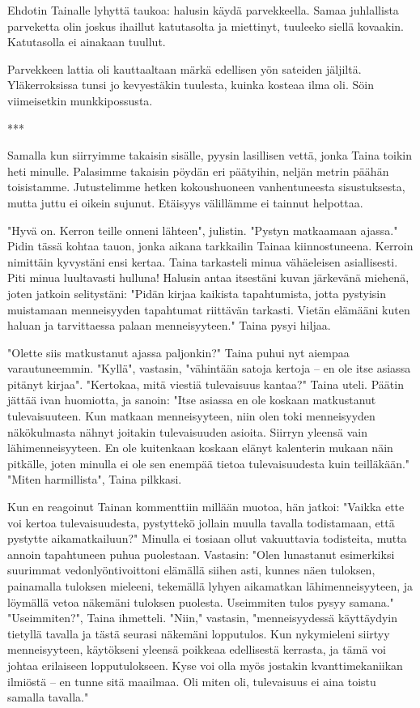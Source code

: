 ﻿\documentclass[a4paper, 12pt, finnish]{article}
\begin{document}
Ehdotin Tainalle lyhyttä taukoa: halusin käydä parvekkeella. Samaa
juhlallista parveketta olin joskus ihaillut katutasolta
ja miettinyt, tuuleeko siellä kovaakin. Katutasolla ei ainakaan tuullut.

Parvekkeen lattia oli kauttaaltaan märkä edellisen yön sateiden
jäljiltä. Yläkerroksissa tunsi jo kevyestäkin tuulesta, kuinka
kosteaa ilma oli. Söin viimeisetkin munkkipossusta.

***

Samalla kun siirryimme takaisin sisälle, pyysin lasillisen vettä,
jonka Taina toikin heti minulle. Palasimme takaisin pöydän eri
päätyihin, neljän metrin päähän toisistamme.
Jutustelimme hetken kokoushuoneen vanhentuneesta sisustuksesta,
mutta juttu ei oikein sujunut. Etäisyys välillämme ei tainnut helpottaa.

"Hyvä on. Kerron teille onneni lähteen", julistin.
"Pystyn matkaamaan ajassa." Pidin tässä kohtaa
tauon, jonka aikana tarkkailin Tainaa kiinnostuneena.
Kerroin nimittäin kyvystäni ensi kertaa. Taina tarkasteli
minua vähäeleisen asiallisesti. Piti minua luultavasti hulluna!
Halusin antaa itsestäni kuvan järkevänä miehenä, joten
jatkoin selitystäni: "Pidän kirjaa kaikista tapahtumista,
jotta pystyisin muistamaan menneisyyden tapahtumat riittävän
tarkasti. Vietän elämääni kuten haluan ja tarvittaessa
palaan menneisyyteen." Taina pysyi hiljaa.

"Olette siis matkustanut ajassa paljonkin?" Taina puhui nyt
aiempaa varautuneemmin.
"Kyllä", vastasin, "vähintään satoja kertoja -- en ole
itse asiassa pitänyt kirjaa".
"Kertokaa, mitä viestiä tulevaisuus kantaa?" Taina uteli.
Päätin jättää ivan huomiotta, ja sanoin:
"Itse asiassa en ole koskaan matkustanut
tulevaisuuteen. Kun matkaan menneisyyteen, niin
olen toki menneisyyden näkökulmasta nähnyt joitakin
tulevaisuuden asioita. Siirryn yleensä vain
lähimenneisyyteen. En ole kuitenkaan koskaan elänyt
kalenterin mukaan näin pitkälle, joten minulla
ei ole sen enempää tietoa tulevaisuudesta kuin teilläkään."
"Miten harmillista", Taina pilkkasi.

Kun en reagoinut Tainan kommenttiin millään muotoa, hän jatkoi:
"Vaikka ette voi kertoa tulevaisuudesta, pystyttekö jollain muulla
tavalla todistamaan, että pystytte aikamatkailuun?"
Minulla ei tosiaan ollut vakuuttavia todisteita, mutta annoin tapahtuneen
puhua puolestaan. Vastasin: "Olen lunastanut esimerkiksi
suurimmat vedonlyöntivoittoni elämällä siihen asti,
kunnes näen tuloksen, painamalla tuloksen mieleeni,
tekemällä lyhyen aikamatkan lähimenneisyyteen,
ja löymällä vetoa näkemäni tuloksen puolesta. Useimmiten tulos pysyy samana."
"Useimmiten?", Taina ihmetteli.
"Niin," vastasin, "menneisyydessä käyttäydyin tietyllä tavalla
ja tästä seurasi näkemäni lopputulos. Kun nykymieleni siirtyy
menneisyyteen, käytökseni yleensä poikkeaa edellisestä kerrasta,
ja tämä voi johtaa erilaiseen lopputulokseen. Kyse voi olla myös
jostakin kvanttimekaniikan ilmiöstä -- en tunne sitä maailmaa.
Oli miten oli, tulevaisuus ei aina toistu samalla tavalla."
\end{document}
